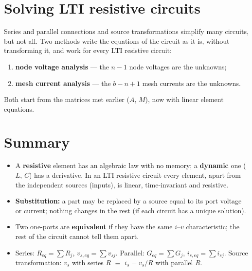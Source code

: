 \documentclass[11pt,a4paper]{article}
\begin{document}
\section{Solving LTI resistive circuits}

Series and parallel connections and source transformations simplify many circuits, but not
all. Two methods write the equations of the circuit as it is, without transforming it, and
work for every LTI resistive circuit:
\begin{enumerate}
  \item \textbf{node voltage analysis} --- the $n - 1$ node voltages are the unknowns;
  \item \textbf{mesh current analysis} --- the $b - n + 1$ mesh currents are the unknowns.
\end{enumerate}
Both start from the matrices met earlier ($A$, $M$), now with linear element equations.

\section*{Summary}

\begin{itemize}
  \item A \textbf{resistive} element has an algebraic law with no memory; a \textbf{dynamic}
        one ($L$, $C$) has a derivative. In an LTI resistive circuit every element, apart from
        the independent sources (inputs), is linear, time-invariant and resistive.
  \item \textbf{Substitution:} a part may be replaced by a source equal to its port voltage
        or current; nothing changes in the rest (if each circuit has a unique solution).
  \item Two one-ports are \textbf{equivalent} if they have the same $i$--$v$ characteristic;
        the rest of the circuit cannot tell them apart.
  \item Series: $R_{eq} = \sum R_j$, $v_{s,eq} = \sum v_{sj}$. Parallel: $G_{eq} = \sum G_j$,
        $i_{s,eq} = \sum i_{sj}$. Source transformation: $v_s$ with series $R$ $\equiv$
        $i_s = v_s/R$ with parallel $R$.
\end{itemize}
\end{document}
